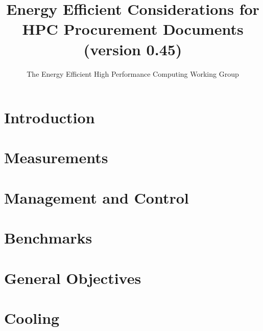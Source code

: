 \documentclass[runningheads,parskip=full]{scrreprt}
\begin{document}
\pagestyle{headings}  %

\title{
Energy Efficient Considerations for HPC Procurement Documents \\
\bigskip
\normalsize{(version 0.45)}
}

\author{The Energy Efficient High Performance Computing Working Group}


\date{ }
\maketitle              %

\tableofcontents
\listoftables
\listoffigures

%
\chapter{Introduction}

\label{sec:intro}

\chapter{Measurements}

\label{sec:measurements}

\chapter{Management and Control}

\label{sec:management}

\chapter{Benchmarks}

\label{sec:benchmarks}

\chapter{General Objectives}

\label{sec:genobjectives}

\chapter{Cooling}

\label{sec:cooling}
\end{document}
